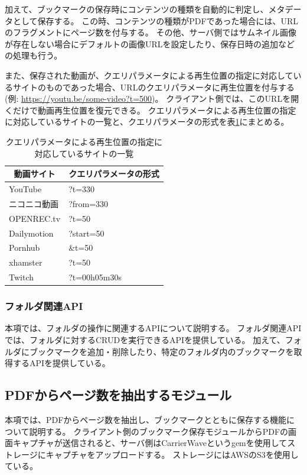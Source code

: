 加えて、ブックマークの保存時にコンテンツの種類を自動的に判定し、メタデータとして保存する。
この時、コンテンツの種類がPDFであった場合には、URLのフラグメントにページ数を付与する。
その他、サーバ側ではサムネイル画像が存在しない場合にデフォルトの画像URLを設定したり、保存日時の追加などの処理も行う。

また、保存された動画が、クエリパラメータによる再生位置の指定に対応しているサイトのものであった場合、URLのクエリパラメータに再生位置を付与する(例: \url{https://youtu.be/some-video?t=500})。
クライアント側では、このURLを開くだけで動画再生位置を復元できる。
クエリパラメータによる再生位置の指定に対応しているサイトの一覧と、クエリパラメータの形式を表\ref{tb:impl-server-video-query-params}にまとめる。

\begin{table}[htbp]
  \label{tb:impl-server-video-query-params}
  \caption{クエリパラメータによる再生位置の指定に対応しているサイトの一覧}
  \begin{center}
    \begin{tabular}{|l|l|}
    \hline
    \multicolumn{1}{|c|}{\textbf{動画サイト}} & \multicolumn{1}{|c|}{\textbf{クエリパラメータの形式}} \\\hline
    YouTube & ?t=330 \\ \hline
    ニコニコ動画 & ?from=330 \\ \hline
    OPENREC.tv & ?t=50 \\ \hline
    Dailymotion & ?start=50 \\ \hline
    Pornhub & \&t=50 \\ \hline
    xhamster & ?t=50 \\ \hline
    Twitch & ?t=00h05m30s \\ \hline
    \end{tabular}
  \end{center}
\end{table}

\subsubsection{フォルダ関連API}
本項では、フォルダの操作に関連するAPIについて説明する。
フォルダ関連APIでは、フォルダに対するCRUDを実行できるAPIを提供している。
加えて、フォルダにブックマークを追加・削除したり、特定のフォルダ内のブックマークを取得するAPIを提供している。

\subsection{PDFからページ数を抽出するモジュール}
本項では、PDFからページ数を抽出し、ブックマークとともに保存する機能について説明する。
クライアント側のブックマーク保存モジュールからPDFの画面キャプチャが送信されると、サーバ側はCarrierWave\cite{carrier-wave}というgemを使用してストレージにキャプチャをアップロードする。
ストレージにはAWSのS3\cite{s3}を使用している。

